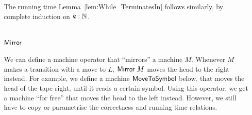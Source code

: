 The running time Lemma~\ref{lem:While_TerminatesIn} follows similarly, by complete induction on $k:\mathbb{N}$.



\section{$\mathsf{Mirror}$}
\label{sec:mirror}

We can define a machine operator that ``mirrors'' a machine $M$.  Whenever $M$ makes a transition with a move to $L$, $\mathsf{Mirror}~M$ moves the head
to the right instead.  For example, we define a machine $\mathsf{MoveToSymbol}$ below, that moves the head of the tape right, until it reads a certain
symbol.  Using this operator, we get a machine ``for free'' that moves the head to the left instead.  However, we still have to copy or parametrise
the correctness and running time relations.


